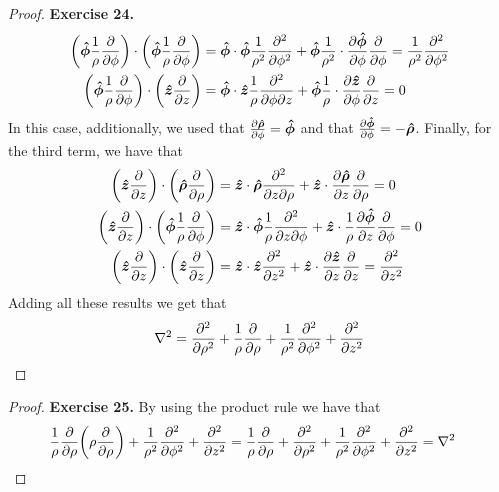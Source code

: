 \documentclass[11pt]{article}
\newcommand{\hatz}{\bm{\hat{z}}}
\newcommand{\hatrho}{\bm{\hat{\rho}}}
\newcommand{\hatphi}{\bm{\hat{\phi}}}
\theoremstyle{definition}
\begin{document}
\begin{proof}{\textbf{Exercise 24.}}
\begin{align*}
        \bigg(\hatphi \frac{1}{\rho} \partialderivative{}{\phi}\bigg) \cdot
        \bigg(\hatphi \frac{1}{\rho} \partialderivative{}{\phi}\bigg)
        &= \hatphi \cdot \hatphi \frac{1}{\rho^2} \partialderivative{^2}{\phi^2}
        + \hatphi \frac{1}{\rho^2} \cdot \partialderivative{\hatphi}{\phi}
        \partialderivative{}{\phi}
        = \frac{1}{\rho^2} \partialderivative{^2}{\phi^2}\\
        \bigg(\hatphi \frac{1}{\rho} \partialderivative{}{\phi}\bigg)\cdot
        \bigg(\hatz \partialderivative{}{z}\bigg)
        &= \hatphi \cdot \hatz \frac{1}{\rho} \partialderivative{^2}{\phi\partial z}
        + \hatphi\frac{1}{\rho} \cdot \partialderivative{\hatz}{\phi}
        \partialderivative{}{z}
        = 0
    \end{align*}
    In this case, additionally, we used that
    $\partialderivative{\hatrho}{\phi} = \hatphi$ and that
    $\partialderivative{\hatphi}{\phi} = -\hatrho$.
    Finally, for the third term, we have that
    \begin{align*}
        \bigg(\hatz \partialderivative{}{z}\bigg)\cdot
        \bigg(\hatrho \partialderivative{}{\rho}\bigg)
        &= \hatz \cdot \hatrho \partialderivative{^2}{z\partial \rho}
        + \hatz \cdot \partialderivative{\hatrho}{z}
        \partialderivative{}{\rho}
        = 0\\
        \bigg(\hatz \partialderivative{}{z}\bigg)\cdot
        \bigg(\hatphi \frac{1}{\rho} \partialderivative{}{\phi}\bigg)
        &= \hatz \cdot \hatphi \frac{1}{\rho}\partialderivative{^2}{z\partial \phi}
        + \hatz \cdot \frac{1}{\rho}\partialderivative{\hatphi}{z}
        \partialderivative{}{\phi}
        = 0\\
        \bigg(\hatz \partialderivative{}{z}\bigg)\cdot
        \bigg(\hatz \partialderivative{}{z}\bigg)
        &= \hatz \cdot \hatz \partialderivative[2]{}{z}
        + \hatz \cdot \partialderivative{\hatz}{z}
        \partialderivative{}{z}
        = \partialderivative[2]{}{z}
    \end{align*}
    Adding all these results we get that
    \begin{align*}
        \laplacian = \partialderivative[2]{}{\rho}
        + \frac{1}{\rho}\partialderivative{}{\rho}
        + \frac{1}{\rho^2} \partialderivative{^2}{\phi^2}
        + \partialderivative{^2}{z^2}
    \end{align*}
\end{proof}
\cleardoublepage
\begin{proof}{\textbf{Exercise 25.}}
    By using the product rule we have that
    \begin{align*}
        \frac{1}{\rho}\partialderivative{}{\rho}
        \bigg(\rho\partialderivative{}{\rho}\bigg)
        + \frac{1}{\rho^2} \partialderivative{^2}{\phi^2}
        + \partialderivative{^2}{z^2}
        &= 
        \frac{1}{\rho}\partialderivative{}{\rho}
        + \partialderivative{^2}{\rho^2}
        + \frac{1}{\rho^2} \partialderivative{^2}{\phi^2}
        + \partialderivative{^2}{z^2}
        = \laplacian
    \end{align*}
\end{proof}
\end{document}

